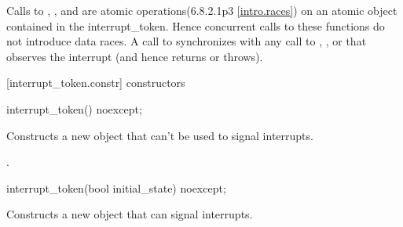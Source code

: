 {Calls to , , and 
are atomic operations(6.8.2.1p3 \ref{intro.races}) on an atomic object contained in the interrupt_token.
Hence concurrent calls to these functions do not introduce data races. 
A call to  synchronizes with any call to ,
, or  that observes the interrupt
(and hence returns  or throws).

%
%


[interrupt_token.constr]{ constructors}

%
\begin{itemdecl}
interrupt_token() noexcept;
\end{itemdecl}
\begin{itemdescr}
  \pnum\effects Constructs a new  object that can't be used to signal interrupts.

  \pnum\postconditions {}.
\end{itemdescr}

%
\begin{itemdecl}
interrupt_token(bool initial_state) noexcept;
\end{itemdecl}
\begin{itemdescr}
  \pnum\effects Constructs a new  object that can signal interrupts.


\end{itemdescr}}
